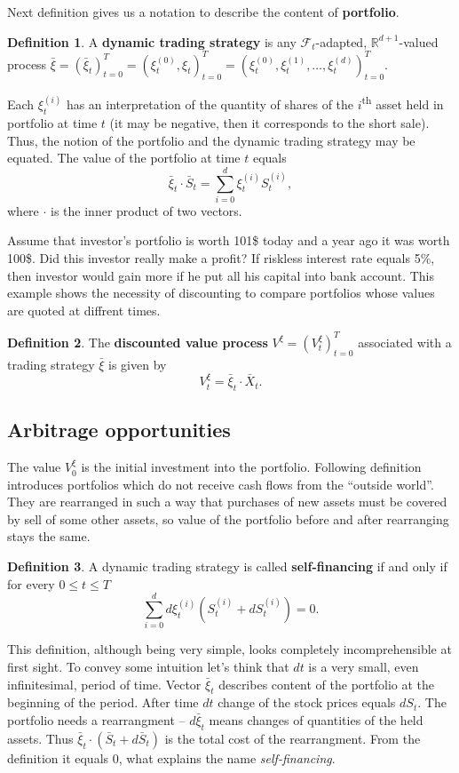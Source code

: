 \documentclass[a4paper,12pt, twoside]{book}
\theoremstyle{definition}
\newtheorem{mydef}{Definition}[section]
\theoremstyle{remark}
\def\R{{\mathbb{R}}}
\def\Sa{\bar{S}}
\def\Xa{\bar{X}}
\def\xia{\bar{\xi}}
\begin{document}
Next definition gives us a notation to describe the content of \textbf{portfolio}.
\begin{mydef}
A \textbf{dynamic trading strategy} is any $\mathcal{F}_t$-adapted,  $\R^{d+1}$-valued process $\xia = (\xia_t)_{t=0}^T = (\xi^{(0)}_t, \xi_t)_{t=0}^T = (\xi^{(0)}_t, \xi^{(1)}_t, \ldots, \xi^{(d)}_t)_{t=0}^T$.
\end{mydef}
Each $\xi^{(i)}_t$ has an interpretation of the quantity of shares of the $i$\textsuperscript{th} asset held in portfolio at time $t$ (it may be negative, then it corresponds to the short sale). Thus, the notion of the portfolio and the dynamic trading strategy may be equated. The value of the portfolio at time $t$ equals
\[\xia_t \cdot \Sa_t = \sum\limits_{i=0}^d \xi^{(i)}_t S^{(i)}_t,\]
where $\cdot$ is the inner product of two vectors.

Assume that investor's portfolio is worth 101\$ today and a year ago it was worth 100\$. Did this investor really make a profit? If riskless interest rate equals 5\%, then investor would gain more if he put all his capital into bank account. This example shows the necessity of discounting to compare portfolios whose values are quoted at diffrent times.
\begin{mydef}
 The \textbf{discounted value process} $V^{\xi} = (V^{\xi}_t)_{t=0}^T$ associated with a trading strategy $\xia$ is given by 
 \begin{equation*}
  V^{\xi}_t = \xia_t \cdot \Xa_t.
 \end{equation*}
\end{mydef}

\subsection{Arbitrage opportunities}
The value $V^{\xi}_0$ is the initial investment into the portfolio. Following definition introduces portfolios which do not receive cash flows from the ``outside world''. They are rearranged in such a way that purchases of new assets must be covered by sell of some other assets, so value of the portfolio before and after rearranging stays the same.
\begin{mydef}
 A dynamic trading strategy is called \textbf{self-financing} if and only if for every $0 \leq t \leq T$
 \[ \sum\limits_{i=0}^d d\xi^{(i)}_t (S^{(i)}_t + dS^{(i)}_t) = 0. \]
\end{mydef}
This definition, although being very simple, looks completely incomprehensible at first sight. To convey some intuition let's think that $dt$ is a very small, even infinitesimal, period of time. Vector $\xia_t$ describes content of the portfolio at the beginning of the period. After time $dt$ change of the stock prices equals $dS_t$. The portfolio needs a rearrangment -- $d\xia_t$ means changes of quantities of the held assets. Thus $\xia_t \cdot (\Sa_t + d\Sa_t)$ is the total cost of the rearrangment. From the definition it equals 0, what explains the name \textit{self-financing}.
\end{document}
